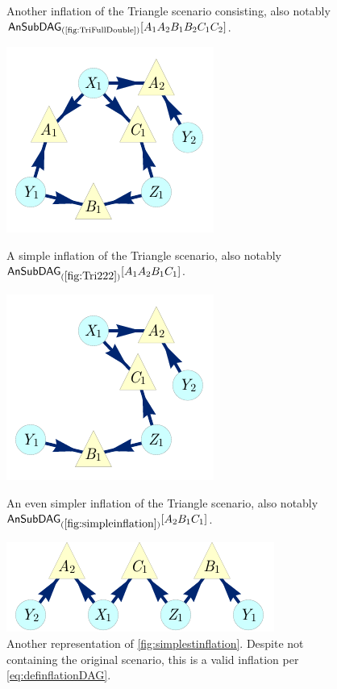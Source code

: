 \begin{figure}[h]
\begin{minipage}[b]{0.35\linewidth}
\caption{Another inflation of the Triangle scenario consisting, also notably $\ansubgraph[(\textrm{\cref{fig:TriFullDouble}})]{A_1 A_2 B_1 B_2 C_1 C_2}$.}\label{fig:Tri222}
\end{minipage}
\end{figure}

\begin{figure}[hb]
\centering
\begin{minipage}[t]{0.3\linewidth}
\centering
\includegraphics[scale=1]{broadcastingexamplenohighlight.pdf}
\caption{A simple inflation of the Triangle scenario, also notably $\ansubgraph[(\cref{fig:Tri222})]{A_1 A_2 B_1 C_1}$.}\label{fig:simpleinflation}
\end{minipage}\hfill
\begin{minipage}[t]{0.275\linewidth}
\centering
\includegraphics[scale=1]{nobroadcastingexamplenohighlight.pdf}
\caption{An even simpler inflation of the Triangle scenario, also notably $\ansubgraph[(\cref{fig:simpleinflation})]{A_2 B_1 C_1}$. }\label{fig:simplestinflation}
\end{minipage}
\hfill
\begin{minipage}[t]{0.325\linewidth}
\centering
\includegraphics[scale=1]{TriDagSubA2B1C1.pdf}
\caption{Another representation of \cref{fig:simplestinflation}. Despite not containing the original scenario, this is a valid inflation per \cref{eq:definflationDAG}.}\label{fig:TriDagSubA2B1C1}
\end{minipage}
\end{figure}


